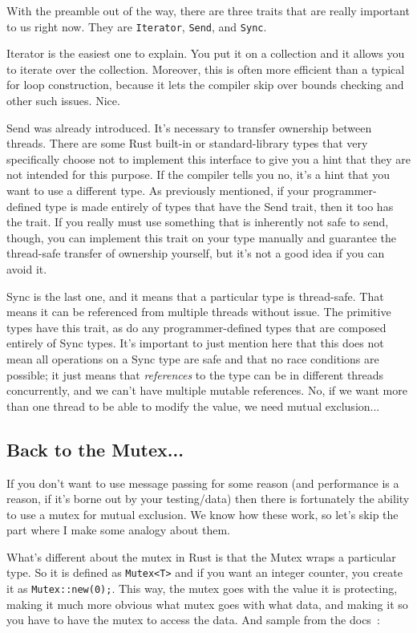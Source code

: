 \documentclass[a4paper]{report}
\begin{document}
With the preamble out of the way, there are three traits that are really important to us right now. They are \texttt{Iterator}, \texttt{Send}, and \texttt{Sync}. 

Iterator is the easiest one to explain. You put it on a collection and it allows you to iterate over the collection. Moreover, this is often more efficient than a typical for loop construction, because it lets the compiler skip over bounds checking and other such issues. Nice.

Send was already introduced. It's necessary to transfer ownership between threads. There are some Rust built-in or standard-library types that very specifically choose not to implement this interface to give you a hint that they are not intended for this purpose. If the compiler tells you no, it's a hint that you want to use a different type. As previously mentioned, if your programmer-defined type is made entirely of types that have the Send trait, then it too has the trait. If you really must use something that is inherently not safe to send, though, you can implement this trait on your type manually and guarantee the thread-safe transfer of ownership yourself, but it's not a good idea if you can avoid it.

Sync is the last one, and it means that a particular type is thread-safe. That means it can be referenced from multiple threads without issue. The primitive types have this trait, as do any programmer-defined types that are composed entirely of Sync types. It's important to just mention here that this does not mean all operations on a Sync type are safe and that no race conditions are possible; it just means that \textit{references} to the type can be in different threads concurrently, and we can't have multiple mutable references. No, if we want more than one thread to be able to modify the value, we need mutual exclusion...

\subsection*{Back to the Mutex...}
If you don't want to use message passing for some reason (and performance is a reason, if it's borne out by your testing/data) then there is fortunately the ability to use a mutex for mutual exclusion. We know how these work, so let's skip the part where I make some analogy about them. 

What's different about the mutex in Rust is that the Mutex wraps a particular type. So it is defined as \texttt{Mutex<T>} and if you want an integer counter, you create it as \texttt{Mutex::new(0);}. This way, the mutex goes with the value it is protecting, making it much more obvious what mutex goes with what data, and making it so you have to have the mutex to access the data. And sample from the docs~\cite{rustdocs}:
\end{document}
